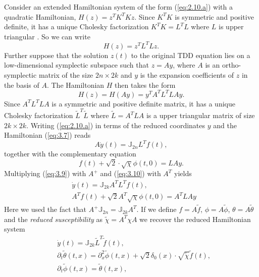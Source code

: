 Consider an extended Hamiltonian system of the form (\ref{eq:2.10.a}) with a quadratic Hamiltonian, $H(z) = z^TK^TKz$. Since $K^TK$ is symmetric and positive definite, it has a unique Cholesky factorization $K^TK = L^T L$ where $L$ is upper triangular \cite{strang09}. So we can write 
\begin{equation} \label{eq:3.7}
H(z) = z^T L^T L z.
\end{equation}
Further suppose that the solution $z(t)$ to the original TDD equation lies on a low-dimensional symplectic subspace such that $z = Ay$, where $A$ is an ortho-symplectic matrix of the size $2n\times 2k$ and $y$ is the expansion coefficients of $z$ in the basis of $A$. The Hamiltonian $H$ then takes the form
\begin{equation} \label{eq:3.8}
	H(z) = H(Ay) = y^T A^T L^T L A y.
\end{equation}
Since $A^T L^T L A$ is a symmetric and positive definite matrix, it has a unique Cholesky factorization $\tilde L^T \tilde L$ where $\tilde L = A^T L A$ is a upper triangular matrix of size $2k \times 2k$. Writing (\ref{eq:2.10.a}) in terms of the reduced coordinates $y$ and the Hamiltonian (\ref{eq:3.7}) reads
\begin{equation} \label{eq:3.9}
		A\dot{y}(t) = \mathbb J_{2n} L^T f(t),
\end{equation}
together with the complementary equation
\begin{equation} \label{eq:3.10}
	f(t) + \sqrt 2 \cdot \sqrt{\chi} \phi(t,0) = LAy.
\end{equation}
Multiplying (\ref{eq:3.9}) with $A^+$ and (\ref{eq:3.10}) with $A^T$ yields
\begin{align} \label{eq:3.11}
	& \dot y(t) = \mathbb J_{2k} A^T L^T f(t), \\
	& A^T f(t) + \sqrt{2} A^T \sqrt{\chi} \phi(t,0) = A^T L A y
\end{align}
Here we used the fact that $A^+\mathbb J_{2n} = \mathbb{J}_{2k} A^T$. If we define $f = A \tilde f$, $\phi = A \tilde \phi$, $\theta = A\tilde \theta$ and the \emph{reduced susceptibility} as $\tilde \chi = A^T \chi A$ we recover the reduced Hamiltonian system
\begin{subequations}
\begin{align}
		\label{eq:3.12.a} & \dot{y}(t) = \mathbb J_{2k} {\tilde L}^T \tilde f(t), \\
		\label{eq:3.12.b} & \partial_t \tilde \theta(t,x) = \partial_x^2 \tilde \phi(t,x) + \sqrt 2 \delta_0(x) \cdot \sqrt{\tilde \chi}  \tilde f(t), \\
		\label{eq:3.12.c} & \partial_t \tilde \phi(t,x) = \tilde \theta(t,x),
\end{align}
\end{subequations}
